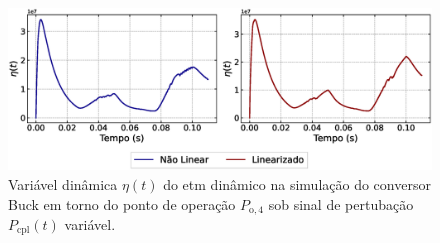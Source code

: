 \begin{figure}[H]
  \centering
  \captionsetup{justification=centering}
  \includegraphics[width=1.\textwidth]{figuras/dynamic-etm/boost/sim2/op2/eta.eps}
  \caption{Variável dinâmica $\eta(t)$ do \acrshort{etm} dinâmico na simulação do conversor Buck em torno do ponto de operação $P_{\mathrm{o}, 4}$ sob sinal de pertubação $P_{\mathrm{cpl}}(t)$ variável.}
\end{figure}